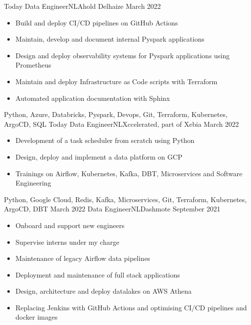 %
%
%
\begin{experiences}
  \experience
  {Today}   {Data Engineer}{NL}{Ahold Delhaize}
  {March 2022} {
    \begin{itemize}
      \item Build and deploy CI/CD pipelines on GitHub Actions
      \item Maintain, develop and document internal Pyspark applications
      \item Design and deploy observability systems for Pyspark applications using Prometheus
      \item Maintain and deploy Infrastructure as Code scripts with Terraform
      \item Automated application documentation with Sphinx
    \end{itemize}
  }
  {Python, Azure, Databricks, Pyspark, Devops, Git, Terraform, Kubernetes, ArgoCD, SQL}
  \emptySeparator
  \experience
  {Today}   {Data Engineer}{NL}{Xccelerated, part of Xebia}
  {March 2022} {
    \begin{itemize}
      \item Development of a task scheduler from scratch using Python
      \item Design, deploy and implement a data platform on GCP
      \item Trainings on Airflow, Kubernetes, Kafka, DBT, Microservices and Software Engineering
    \end{itemize}
  }
  {Python, Google Cloud, Redis, Kafka, Microservices, Git, Terraform, Kubernetes, ArgoCD, DBT}
  \emptySeparator
  \experience
  {March 2022}   {Data Engineer}{NL}{Dashmote}
  {September 2021} {
    \begin{itemize}
      \item Onboard and support new engineers
      \item Supervise interns under my charge
      \item Maintenance of legacy Airflow data pipelines
      \item Deployment and maintenance of full stack applications
      \item Design, architecture and deploy datalakes on AWS Athena
      \item Replacing Jenkins with GitHub Actions and optimising CI/CD pipelines and docker images


\end{itemize}}
\end{experiences}
